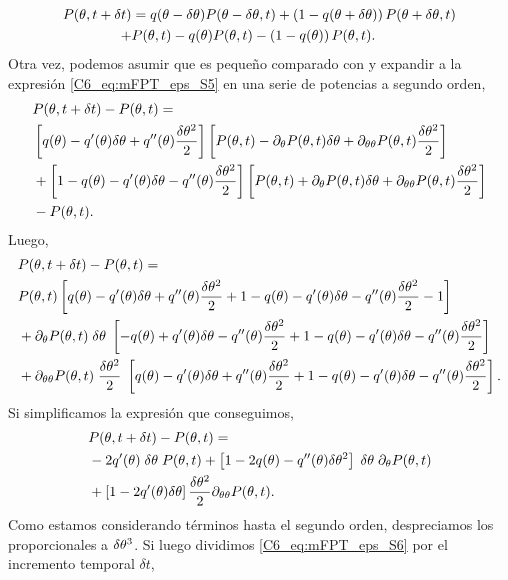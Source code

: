 \documentclass[./main.tex]{subfiles}
\begin{document}
\begin{align}
    P(\theta,t + \delta t ) &=  q(\theta - \delta\theta) P(\theta-\delta\theta,t) + \left(1-q(\theta + \delta\theta)\right) P(\theta+\delta\theta,t) \nonumber \\ +& P(\theta,t) - q(\theta) P(\theta,t) - \left(1-q(\theta)\right) P(\theta,t).
    \label{C6_eq:mFPT_eps_S5}
\end{align}
Otra vez, podemos asumir que \deltax es pequeño comparado con \xx y expandir a la expresión \ref{C6_eq:mFPT_eps_S5} en una serie de potencias a segundo orden, 
\begin{align}
    & P( \theta,t + \delta t) - P(\theta,t) = \nonumber \\
    & \left[ q(\theta) - q'(\theta)\delta\theta + q''(\theta) \frac{\delta\theta^2}{2}  \right] \left[ P(\theta,t) - \partial_\theta P(\theta,t) \delta\theta + \partial_{\theta \theta} P(\theta,t) \frac{\delta\theta^2}{2}  \right] \nonumber \\ & + \left[ 1 - q(\theta) - q'(\theta)\delta\theta - q''(\theta) \frac{\delta\theta^2}{2}  \right] \left[ P(\theta,t) + \partial_\theta P(\theta,t) \delta\theta + \partial_{\theta \theta} P(\theta,t) \frac{\delta\theta^2}{2}  \right] \nonumber \\ & - P(\theta,t) .
\end{align}
Luego, 
\begin{align}
    & P( \theta,t + \delta t) - P(\theta,t) = \nonumber \\
    & P(\theta,t) \left[ q(\theta) - q'(\theta)\delta\theta + q''(\theta) \frac{\delta\theta^2}{2} + 1 - q(\theta) - q'(\theta)\delta\theta - q''(\theta) \frac{\delta\theta^2}{2} -1\right] \nonumber \\ & + \partial_\theta P(\theta,t) \; \delta\theta \; \left[ - q(\theta) + q'(\theta)\delta\theta - q''(\theta) \frac{\delta\theta^2}{2} + 1 - q(\theta) - q'(\theta)\delta\theta - q''(\theta) \frac{\delta\theta^2}{2}\right] \nonumber \\ &+ \partial_{\theta \theta} P(\theta,t) \;  \frac{\delta\theta^2}{2} \; \left[  q(\theta) - q'(\theta)\delta\theta + q''(\theta) \frac{\delta\theta^2}{2} +  1 - q(\theta) - q'(\theta)\delta\theta - q''(\theta) \frac{\delta\theta^2}{2} \right] .
\end{align}
Si simplificamos la expresión que conseguimos, 
\begin{align}
     & P( \theta,t + \delta t) - P(\theta,t) = \nonumber \\
     & - 2 q'(\theta) \; \delta\theta \; P(\theta,t) + \left[ 1- 2 q(\theta) - q''(\theta) \delta\theta^2 \right] \; \delta\theta \; \partial_\theta P(\theta,t) \nonumber \\ & +\left[ 1-2 q'(\theta) \delta\theta \right] \frac{\delta\theta^2}{2}\partial_{\theta \theta} P(\theta,t)  .
     \label{C6_eq:mFPT_eps_S6}
\end{align}
Como estamos considerando términos hasta el segundo orden, despreciamos los proporcionales a $\delta\theta^3$. Si luego dividimos \ref{C6_eq:mFPT_eps_S6} por el incremento temporal $\delta t$,
\end{document}
